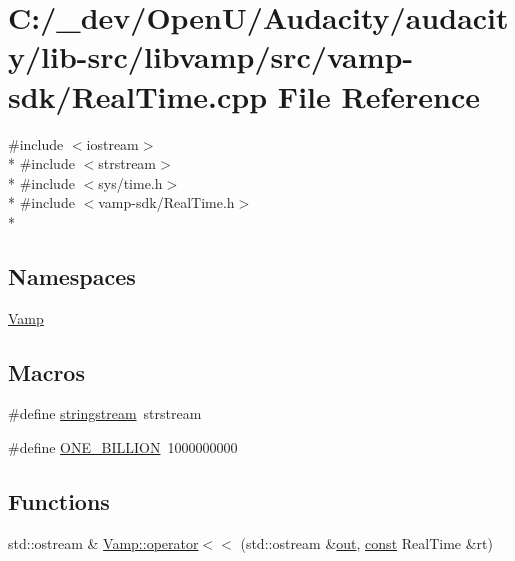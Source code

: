 \hypertarget{vamp-sdk_2_real_time_8cpp}{}\section{C\+:/\+\_\+dev/\+Open\+U/\+Audacity/audacity/lib-\/src/libvamp/src/vamp-\/sdk/\+Real\+Time.cpp File Reference}
\label{vamp-sdk_2_real_time_8cpp}
{\ttfamily \#include $<$iostream$>$}\\*
{\ttfamily \#include $<$strstream$>$}\\*
{\ttfamily \#include $<$sys/time.\+h$>$}\\*
{\ttfamily \#include $<$vamp-\/sdk/\+Real\+Time.\+h$>$}\\*
\subsection*{Namespaces}
\begin{DoxyCompactItemize}
\item 
 \hyperlink{namespace_vamp}{Vamp}
\end{DoxyCompactItemize}
\subsection*{Macros}
\begin{DoxyCompactItemize}
\item 
\#define \hyperlink{vamp-sdk_2_real_time_8cpp_af265757a67f4d68101c17dbc0ce1294e}{stringstream}~strstream
\item 
\#define \hyperlink{vamp-sdk_2_real_time_8cpp_af05eba65a3d4d0547dba7e69e440db2c}{O\+N\+E\+\_\+\+B\+I\+L\+L\+I\+ON}~1000000000
\end{DoxyCompactItemize}
\subsection*{Functions}
\begin{DoxyCompactItemize}
\item 
std\+::ostream \& \hyperlink{namespace_vamp_a84f347b339c111e035f4f0d6ed37f4e0}{Vamp\+::operator$<$$<$} (std\+::ostream \&\hyperlink{latency_8c_a71fd1c281affec034757279e4f91c50b}{out}, \hyperlink{getopt1_8c_a2c212835823e3c54a8ab6d95c652660e}{const} Real\+Time \&rt)
\end{DoxyCompactItemize}


